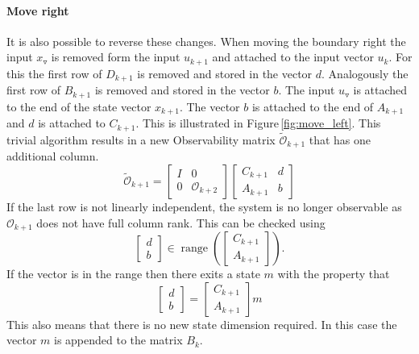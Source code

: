 \documentclass[doctype=mastersthesis,BCOR=15mm,biblatex]{ldvbook}%
\DeclareMathOperator{\range}{range}
\newcommand{\Ob}{\mathcal{O}} %
\newcommand{\eye}{I} %
\newcommand{\m}{\triangledown} %
\begin{document}
\paragraph{Move right}
It is also possible to reverse these changes.
When moving the boundary right the input $x_\m$ is removed form the input $u_{k+1}$ and attached to the input vector $u_k$.
For this the first row of $D_{k+1}$ is removed and stored in the vector $d$. Analogously the first row of $B_{k+1}$ is removed and stored in the vector $b$.
The input $u_\m$ is attached to the end of the state vector $x_{k+1}$.
The vector $b$ is attached to the end of $A_{k+1}$ and $d$ is attached to $C_{k+1}$.
This is illustrated in Figure\,\ref{fig:move_left}.
This trivial algorithm results in a new Observability matrix $\tilde{\Ob}_{k+1}$ that has one additional column.
\begin{equation}\label{eq:strucure_mover}
	\tilde{\Ob}_{k+1}
	=
	\begin{bmatrix}
	\eye & 0\\ 0 &\Ob_{k+2}
	\end{bmatrix}
	\begin{bmatrix}
	C_{k+1} & d\\
	A_{k+1} & b
	\end{bmatrix}
\end{equation}
If the last row is not linearly independent, the system is no longer observable as $\Ob_{k+1}$ does not have full column rank.
This can be checked using
\begin{equation}
	\begin{bmatrix}
	d\\b
	\end{bmatrix}
	\in
	\range\left(
	\begin{bmatrix}
	C_{k+1}\\A_{k+1}
	\end{bmatrix}\right).
\end{equation}
If the vector is in the range then there exits a state $m$ with the property that
\begin{equation}
	\begin{bmatrix}
	d\\b
	\end{bmatrix}
	=
	\begin{bmatrix}
	C_{k+1}\\A_{k+1}
	\end{bmatrix}
	m
\end{equation}
This also means that there is no new state dimension required.
In this case the vector $m$ is appended to the matrix $B_{k}$.
\end{document}
